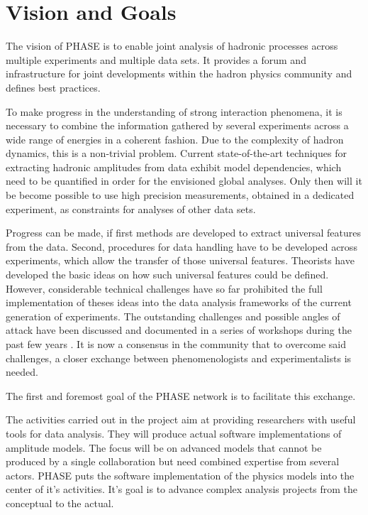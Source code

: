 \section{Vision and Goals}

The vision of PHASE is to enable joint analysis of hadronic processes across multiple experiments and multiple data sets. It provides a forum and infrastructure for joint developments within the hadron physics community and defines best practices.

To make progress in the understanding of strong interaction phenomena, it is necessary to combine the information gathered by several experiments across a wide range of energies in a coherent fashion. Due to the complexity of hadron dynamics, this is a non-trivial problem. Current state-of-the-art techniques for extracting hadronic amplitudes from data exhibit model dependencies, which need to be quantified in order for the envisioned global analyses. Only then will it be become possible to use high precision measurements, obtained in a dedicated experiment, as constraints for analyses of other data sets. 

Progress can be made, if first methods are developed to extract universal features from the data. Second, procedures for data handling have to be developed across experiments, which allow the transfer of those universal features. Theorists have developed the basic ideas on how such universal features could be defined. However, considerable technical challenges have so far prohibited the full implementation of theses ideas into the data analysis frameworks of the current generation of experiments. The outstanding challenges and possible angles of attack have been discussed and documented in a series of workshops during the past few years \cite{Battaglieri_2015, Brice_o_2016, Lutz_2016}. It is now a consensus in the community that to overcome said challenges, a closer exchange between phenomenologists and experimentalists is needed.

The first and foremost goal of the PHASE network is to facilitate this exchange. 

The activities carried out in the project aim at providing researchers with useful tools for data analysis. They will produce actual software implementations of amplitude models. The focus will be on advanced models that cannot be produced by a single collaboration but need combined expertise from several actors. PHASE puts the software implementation of the physics models into the center of it's activities. It's goal is to advance complex analysis projects from the conceptual to the actual.





